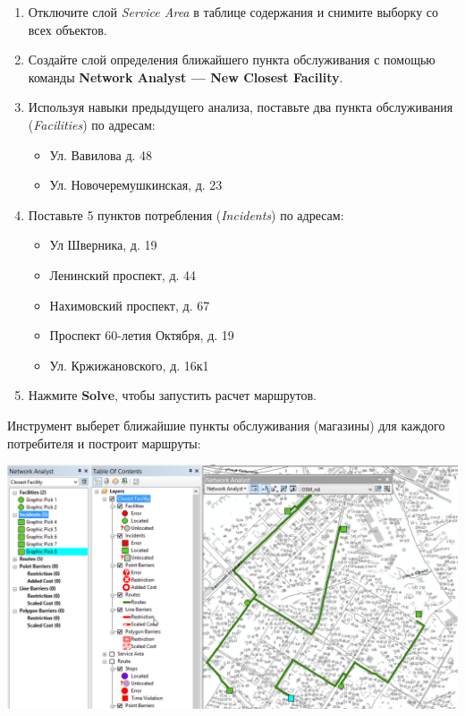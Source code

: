 \documentclass[]{book}
\providecommand{\tightlist}{%
  \setlength{\itemsep}{0pt}\setlength{\parskip}{0pt}}
\theoremstyle{definition}
\theoremstyle{definition}
\theoremstyle{definition}
\theoremstyle{remark}
\begin{document}
\begin{enumerate}
\def\labelenumi{\arabic{enumi}.}
\item
  Отключите слой \emph{Service Area} в таблице содержания и снимите
  выборку со всех объектов.
\item
  Создайте слой определения ближайшего пункта обслуживания с помощью
  команды \textbf{Network Analyst --- New Closest Facility}.
\item
  Используя навыки предыдущего анализа, поставьте два пункта
  обслуживания (\emph{Facilities}) по адресам:

  \begin{itemize}
  \tightlist
  \item
    Ул. Вавилова д. 48
  \item
    Ул. Новочеремушкинская, д. 23
  \end{itemize}
\item
  Поставьте 5 пунктов потребления (\emph{Incidents}) по адресам:

  \begin{itemize}
  \item
    Ул Шверника, д. 19
  \item
    Ленинский проспект, д. 44
  \item
    Нахимовский проспект, д. 67
  \item
    Проспект 60-летия Октября, д. 19
  \item
    Ул. Кржижановского, д. 16к1
  \end{itemize}
\item
  Нажмите \textbf{Solve}, чтобы запустить расчет маршрутов.
\end{enumerate}

Инструмент выберет ближайшие пункты обслуживания (магазины) для каждого
потребителя и построит маршруты:

\includegraphics{images/Ex12/image20.png}
\end{document}
